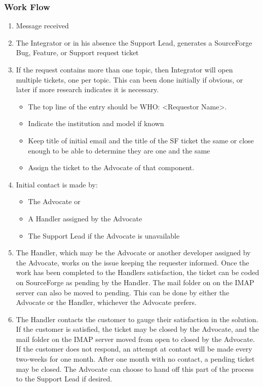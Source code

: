 \subsubsection{Work Flow}
\begin{enumerate}
\item Message received
\item The Integrator or in his absence the Support Lead, generates a SourceForge Bug, Feature, or Support request ticket
\item If the request contains more than one topic, then Integrator will open multiple tickets, one per topic. This can been done
initially if obvious, or later if more research indicates it is necessary. 

\begin{itemize}
\item The top line of the entry should be WHO: <Requestor Name>.
\item Indicate the institution and model if known
\item Keep title of initial email and the title of the SF ticket the
same or close enough to be able to determine they are one and the same
\item Assign the ticket to the Advocate of that component. 
\end{itemize}

\item Initial contact is made by:

\begin{itemize}
\item The Advocate or
\item A Handler assigned by the Advocate
\item The Support Lead if the Advocate is unavailable
\end{itemize}

\item The Handler, which may be the Advocate or another developer assigned by the Advocate, works on the issue keeping the requester informed. Once the work has been completed to the Handlers satisfaction, the ticket can be coded on SourceForge as pending by the Handler.  The mail folder on 
on the IMAP server can also be moved to pending. This can be done by either the Advocate or the Handler, whichever the Advocate prefers.

\item The Handler contacts the customer to gauge their satisfaction in the solution. If the customer is satisfied, the ticket may be closed by the Advocate, and the mail folder on the IMAP server moved from open to 
closed by the Advocate.  If the customer does not respond, an attempt at contact will be made every two-weeks for one month.  After one month with no contact, a pending ticket may be closed. The Advocate can choose to hand off this part of the process to the Support Lead if desired. 
\end{enumerate}

